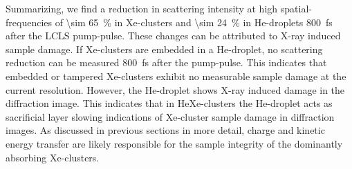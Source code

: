 %
Summarizing, we find a reduction in scattering intensity at high spatial-frequencies of \SI{\sim 65}{\percent} in Xe-clusters and \SI{\sim 24}{\percent} in He-droplets \SI{800}{\femto\second} after the LCLS pump-pulse. These changes can be attributed to X-ray induced sample damage. If Xe-clusters are embedded in a He-droplet, no scattering reduction can be measured \SI{800}{\femto\second} after the pump-pulse. This indicates that embedded or tampered Xe-clusters exhibit no measurable sample damage at the current resolution. However, the He-droplet shows X-ray induced damage in the diffraction image. This indicates that in HeXe-clusters the He-droplet acts as sacrificial layer slowing indications of Xe-cluster sample damage in diffraction images. As discussed in previous sections in  more detail, charge and kinetic energy transfer \cite{Hau-Riege-2007-PRL,Hoener-2008-JPB} are likely responsible for the sample integrity of the dominantly absorbing Xe-clusters.
%
%
%
%
%
%
